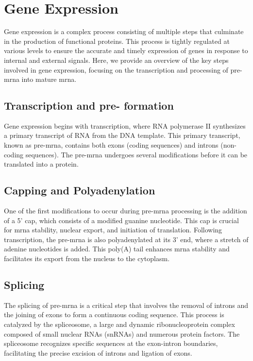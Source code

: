 \section{Gene Expression}
\label{sec:gene_expression}

Gene expression is a complex process consisting of multiple steps that
culminate in the production of functional proteins.
This process is tightly regulated at various levels to ensure the accurate and
timely expression of genes in response to internal and external signals.
Here, we provide an overview of the key steps involved in gene expression,
focusing on the transcription and processing of pre-\gls{mrna} into mature
\gls{mrna}.

\subsection{Transcription and pre- formation}
Gene expression begins with transcription, where RNA polymerase II synthesizes
a primary transcript of RNA from the DNA template.
This primary transcript, known as pre-\gls{mrna}, contains both exons (coding
sequences) and introns (non-coding sequences)\supercite{lee_mechanisms_2015}.
The pre-\gls{mrna} undergoes several modifications before it can be translated
into a protein.

\subsection{Capping and Polyadenylation}
One of the first modifications to occur during pre-\gls{mrna} processing is the
addition of a 5' cap, which consists of a modified guanine nucleotide.
This cap is crucial for \gls{mrna} stability, nuclear export, and initiation of
translation\supercite{topisirovic_cap_2011}.
Following transcription, the pre-\gls{mrna} is also polyadenylated at its 3'
end, where a stretch of adenine nucleotides is added.
This poly(A) tail enhances \gls{mrna} stability and facilitates its export from
the nucleus to the cytoplasm\supercite{passmore_roles_2022}.

\subsection{Splicing}
The splicing of pre-\gls{mrna} is a critical step that involves the removal of
introns and the joining of exons to form a continuous coding sequence.
This process is catalyzed by the spliceosome, a large and dynamic
ribonucleoprotein complex composed of small nuclear RNAs (snRNAs) and numerous
protein factors\supercite{lee_mechanisms_2015}.
The spliceosome recognizes specific sequences at the exon-intron boundaries,
facilitating the precise excision of introns and ligation of
exons\supercite{wang_splicing_2008}.

